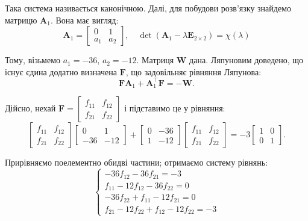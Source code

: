 \documentclass{hw_template}
\begin{document}
Така система називається канонічною. Далі, для побудови розв'язку знайдемо матрицю 
$\boldsymbol{A}_1$. Вона має вигляд:
\begin{equation*}
    \boldsymbol{A}_1 = \begin{bmatrix}
        0 & 1 \\
        a_1 & a_2
    \end{bmatrix}, \quad \det(\boldsymbol{A}_1-\lambda \boldsymbol{E}_{2 \times 2}) = \chi(\lambda)
\end{equation*}

Тому, візьмемо $a_1=-36$, $a_2=-12$. Матриця $\boldsymbol{W}$ дана. Ляпуновим
доведено, що існує єдина додатно визначена $\boldsymbol{F}$, що задовільняє
рівняння Ляпунова:
\begin{equation*}
    \boldsymbol{F}\boldsymbol{A}_1 + \boldsymbol{A}_1^{\top}\boldsymbol{F} = -\boldsymbol{W}.
\end{equation*}

Дійсно, нехай $\boldsymbol{F} = \begin{bmatrix}
    f_{11} & f_{12} \\
    f_{21} & f_{22}
\end{bmatrix}$ і підставимо це у рівняння:
\begin{equation*}
    \begin{bmatrix}
        f_{11} & f_{12} \\
        f_{21} & f_{22}
    \end{bmatrix}\begin{bmatrix}
        0 & 1 \\
        -36 & -12
    \end{bmatrix} + \begin{bmatrix}
        0 & -36 \\
        1 & -12
    \end{bmatrix}\begin{bmatrix}
        f_{11} & f_{12} \\
        f_{21} & f_{22}
    \end{bmatrix} = -3\begin{bmatrix}
        1 & 0 \\
        0 & 1
    \end{bmatrix}.
\end{equation*}

Прирівняємо поелементно обидві частини; отримаємо систему рівнянь:
\begin{equation*}
    \begin{cases}
        -36f_{12} - 36f_{21} = -3 \\
        f_{11}-12f_{12}-36f_{22} = 0 \\
        -36f_{22} + f_{11} - 12f_{21} = 0 \\
        f_{21} - 12f_{22} + f_{12} - 12f_{22} = -3
    \end{cases}
\end{equation*}
\end{document}
